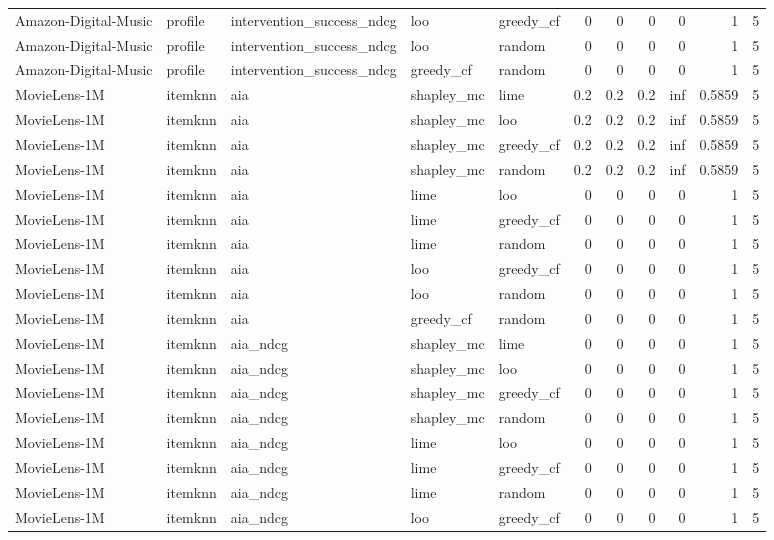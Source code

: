 \begin{table}[t]
{\begin{tabular}{lllllrrrrrr}
Amazon-Digital-Music & profile & intervention\_success\_ndcg & loo & greedy\_cf & 0 & 0 & 0 & 0 & 1 & 5 \\
Amazon-Digital-Music & profile & intervention\_success\_ndcg & loo & random & 0 & 0 & 0 & 0 & 1 & 5 \\
Amazon-Digital-Music & profile & intervention\_success\_ndcg & greedy\_cf & random & 0 & 0 & 0 & 0 & 1 & 5 \\
MovieLens-1M & itemknn & aia & shapley\_mc & lime & 0.2 & 0.2 & 0.2 & inf & 0.5859 & 5 \\
MovieLens-1M & itemknn & aia & shapley\_mc & loo & 0.2 & 0.2 & 0.2 & inf & 0.5859 & 5 \\
MovieLens-1M & itemknn & aia & shapley\_mc & greedy\_cf & 0.2 & 0.2 & 0.2 & inf & 0.5859 & 5 \\
MovieLens-1M & itemknn & aia & shapley\_mc & random & 0.2 & 0.2 & 0.2 & inf & 0.5859 & 5 \\
MovieLens-1M & itemknn & aia & lime & loo & 0 & 0 & 0 & 0 & 1 & 5 \\
MovieLens-1M & itemknn & aia & lime & greedy\_cf & 0 & 0 & 0 & 0 & 1 & 5 \\
MovieLens-1M & itemknn & aia & lime & random & 0 & 0 & 0 & 0 & 1 & 5 \\
MovieLens-1M & itemknn & aia & loo & greedy\_cf & 0 & 0 & 0 & 0 & 1 & 5 \\
MovieLens-1M & itemknn & aia & loo & random & 0 & 0 & 0 & 0 & 1 & 5 \\
MovieLens-1M & itemknn & aia & greedy\_cf & random & 0 & 0 & 0 & 0 & 1 & 5 \\
MovieLens-1M & itemknn & aia\_ndcg & shapley\_mc & lime & 0 & 0 & 0 & 0 & 1 & 5 \\
MovieLens-1M & itemknn & aia\_ndcg & shapley\_mc & loo & 0 & 0 & 0 & 0 & 1 & 5 \\
MovieLens-1M & itemknn & aia\_ndcg & shapley\_mc & greedy\_cf & 0 & 0 & 0 & 0 & 1 & 5 \\
MovieLens-1M & itemknn & aia\_ndcg & shapley\_mc & random & 0 & 0 & 0 & 0 & 1 & 5 \\
MovieLens-1M & itemknn & aia\_ndcg & lime & loo & 0 & 0 & 0 & 0 & 1 & 5 \\
MovieLens-1M & itemknn & aia\_ndcg & lime & greedy\_cf & 0 & 0 & 0 & 0 & 1 & 5 \\
MovieLens-1M & itemknn & aia\_ndcg & lime & random & 0 & 0 & 0 & 0 & 1 & 5 \\
MovieLens-1M & itemknn & aia\_ndcg & loo & greedy\_cf & 0 & 0 & 0 & 0 & 1 & 5 \\

\end{tabular}}
\end{table}
